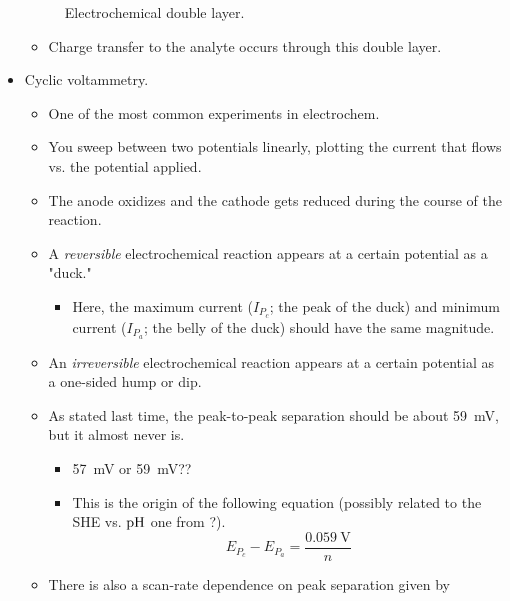 \documentclass[../notes.tex]{subfiles}
\begin{document}
\begin{itemize}
\begin{figure}[h!]
        \caption{Electrochemical double layer.}
        \label{fig:echem2layer}
    \end{figure}
    \begin{itemize}
        \item Charge transfer to the analyte occurs through this double layer.
    \end{itemize}
    \item Cyclic voltammetry.
    \begin{itemize}
        \item One of the most common experiments in electrochem.
        \item You sweep between two potentials linearly, plotting the current that flows vs. the potential applied.
        \item The anode oxidizes and the cathode gets reduced during the course of the reaction.
        \item A \emph{reversible} electrochemical reaction appears at a certain potential as a "duck."
        \begin{itemize}
            \item Here, the maximum current ($I_{P_c}$; the peak of the duck) and minimum current ($I_{P_a}$; the belly of the duck) should have the same magnitude.
        \end{itemize}
        \item An \emph{irreversible} electrochemical reaction appears at a certain potential as a one-sided hump or dip.
        \item As stated last time, the peak-to-peak separation should be about \SI{59}{\milli\volt}, but it almost never is.
        \begin{itemize}
            \item \SI{57}{\milli\volt} or \SI{59}{\milli\volt}??
            \item This is the origin of the following equation (possibly related to the SHE vs. $\operatorname{pH}$ one from \textcite{bib:CHEM26700Notes}?).
            \begin{equation*}
                E_{P_c}-E_{P_a} = \frac{\SI{0.059}{\volt}}{n}
            \end{equation*}
        \end{itemize}
        \item There is also a scan-rate dependence on peak separation given by
        \begin{equation*}

\end{equation*}
\end{itemize}
\end{itemize}
\end{document}

